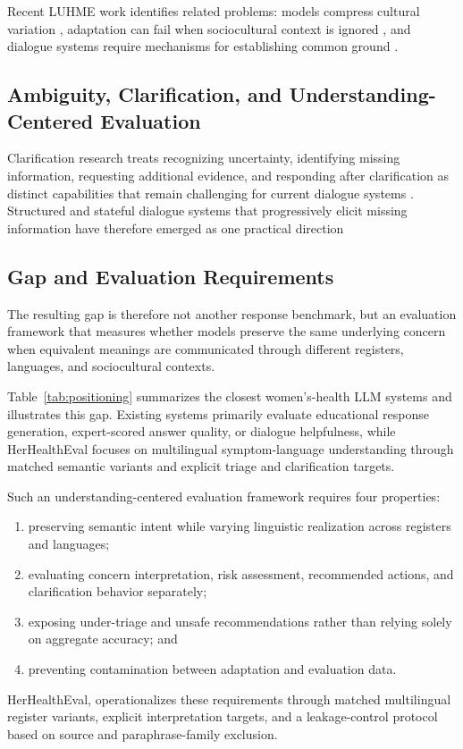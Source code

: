Recent LUHME work identifies related problems:
models compress cultural variation
\citep{mohammadi-etal-2025-large},
adaptation can fail when sociocultural context is ignored
\citep{freitas-cardoso-2025-nightmare},
and dialogue systems require mechanisms for establishing common ground
\citep{anikina-etal-2025-building}.


\subsection{Ambiguity, Clarification, and Understanding-Centered Evaluation}

Clarification research treats recognizing uncertainty, identifying missing
information, requesting additional evidence, and responding after
clarification as distinct capabilities that remain challenging for current
dialogue systems
\citep{testoni-fernandez-2024-asking,
zhang-choi-2025-clarify}. Structured and stateful dialogue systems that progressively elicit missing
information have therefore emerged as one practical direction
\citep{demarco-etal-2024-converso}

\subsection{Gap and Evaluation Requirements}
The resulting gap is therefore not another response benchmark, but an evaluation framework that measures whether models preserve the same underlying concern when equivalent meanings are communicated through different registers, languages, and sociocultural contexts.

Table~\ref{tab:positioning} summarizes the closest women's-health LLM systems and illustrates this gap. Existing systems primarily evaluate educational response generation, expert-scored answer quality, or dialogue helpfulness, while HerHealthEval focuses on multilingual symptom-language understanding through matched semantic variants and explicit triage and clarification targets.

Such an understanding-centered evaluation framework requires four properties:


\begin{enumerate}
    \item preserving semantic intent while varying linguistic realization across registers and languages;
    
    \item evaluating concern interpretation, risk assessment, recommended
    actions, and clarification behavior separately;
    
    \item exposing under-triage and unsafe recommendations rather than
    relying solely on aggregate accuracy; and
    
    \item preventing contamination between adaptation and evaluation data.
\end{enumerate}

HerHealthEval, operationalizes these requirements through matched multilingual
register variants, explicit interpretation targets, and a leakage-control
protocol based on source and paraphrase-family exclusion.


